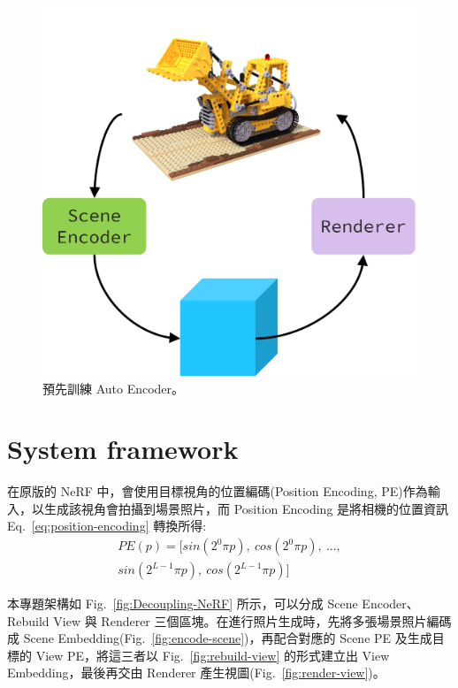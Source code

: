 \documentclass[10pt,twocolumn,letterpaper]{article}
\begin{document}
\begin{CJK}{UTF8}{bkai}
   \begin{figure}[htbp]
      \begin{center}
         \includegraphics[width=1\linewidth]{img/auto-encoder.png}
      \end{center}
      \caption{
         預先訓練 Auto Encoder。
      }
      \label{fig:auto-encoder}
   \end{figure}
   \section{System framework}

   在原版的 NeRF 中，會使用目標視角的位置編碼(Position Encoding,
   PE)作為輸入，以生成該視角會拍攝到場景照片，而 Position Encoding
   是將相機的位置資訊 Eq.~\ref{eq:position-encoding} 轉換所得:
   \begin{equation}
      \begin{aligned}
         PE(p)=[sin(2^{0}{\pi}{p}),~cos(2^{0}{\pi}{p}),~..., \\
         sin(2^{L-1}{\pi}{p}),~cos(2^{L-1}{\pi}{p})]
      \end{aligned}
      \label{eq:position-encoding}
   \end{equation}

   本專題架構如 Fig.~\ref{fig:Decoupling-NeRF} 所示，可以分成 Scene Encoder、Rebuild View 與 Renderer
   三個區塊。在進行照片生成時，先將多張場景照片編碼成 Scene Embedding(Fig.~\ref{fig:encode-scene})，再配合對應的 Scene PE 及生成目標的 View
   PE，將這三者以 Fig.~\ref{fig:rebuild-view} 的形式建立出
   View Embedding，最後再交由 Renderer 產生視圖(Fig.~\ref{fig:render-view})。


\end{CJK}
\end{document}
